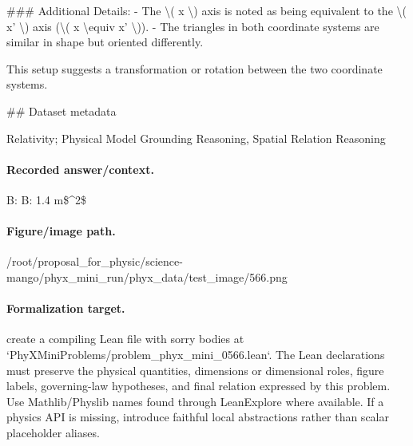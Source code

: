 \#\#\# Additional Details:
- The \textbackslash{}( x \textbackslash{}) axis is noted as being equivalent to the \textbackslash{}( x' \textbackslash{}) axis (\textbackslash{}( x \textbackslash{}equiv x' \textbackslash{})).
- The triangles in both coordinate systems are similar in shape but oriented differently. 

This setup suggests a transformation or rotation between the two coordinate systems.

\#\# Dataset metadata

Relativity; Physical Model Grounding Reasoning, Spatial Relation Reasoning

\paragraph{Recorded answer/context.}
B: B: 1.4 m\$\textasciicircum{}2\$

\paragraph{Figure/image path.}
/root/proposal\_for\_physic/science-mango/phyx\_mini\_run/phyx\_data/test\_image/566.png

\paragraph{Formalization target.}
create a compiling Lean file with sorry bodies at `PhyXMiniProblems/problem\_phyx\_mini\_0566.lean`. The Lean declarations must preserve the physical quantities, dimensions or dimensional roles, figure labels, governing-law hypotheses, and final relation expressed by this problem.
Use Mathlib/Physlib names found through LeanExplore where available. If a physics API is missing, introduce faithful local abstractions rather than scalar placeholder aliases.

